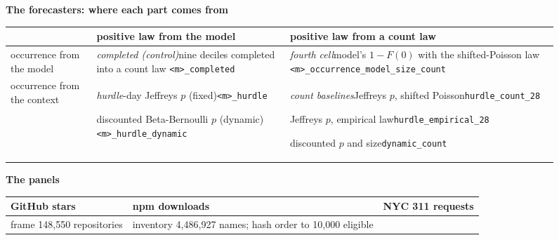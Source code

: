 \begin{figure}[t]
\centering\footnotesize\setlength{\tabcolsep}{4pt}
\begin{minipage}[t]{0.52\textwidth}
\centering
\textbf{The forecasters: where each part comes from}\\[2pt]
\begin{tabular}{@{}P{15mm}P{31mm}P{32mm}@{}}
\toprule
 & positive law from the model & positive law from a count law \\
\midrule
occurrence from the model &
\emph{completed (control)}\newline nine deciles completed into a count law\newline
\texttt{<m>\_completed} &
\emph{fourth cell}\newline model's $1 - F(0)$ with the shifted-Poisson law\newline
\texttt{<m>\_occurrence\_}\newline\texttt{model\_size\_count} \\
\addlinespace
occurrence from the context &
\emph{hurdle}-day Jeffreys $p$ (fixed)\newline \texttt{<m>\_hurdle}\par\vspace{2pt}
discounted Beta-Bernoulli $p$ (dynamic)\newline \texttt{<m>\_hurdle\_dynamic} &
\emph{count baselines}\newline Jeffreys $p$, shifted Poisson\newline \texttt{hurdle\_count\_28}\par\vspace{2pt}
Jeffreys $p$, empirical law\newline \texttt{hurdle\_empirical\_28}\par\vspace{2pt}
discounted $p$ and size\newline \texttt{dynamic\_count} \\
\bottomrule
\end{tabular}
\end{minipage}\hfill
\begin{minipage}[t]{0.46\textwidth}
\centering
\textbf{The panels}\\[2pt]
\begin{tabular}{@{}P{22mm}P{23mm}P{23mm}@{}}
\toprule
GitHub stars & npm downloads & NYC 311 requests \\
\midrule
frame 148,550 repositories & inventory 4,486,927 names; hash order to 10,000 eligible &

\end{tabular}
\end{minipage}
\end{figure}
